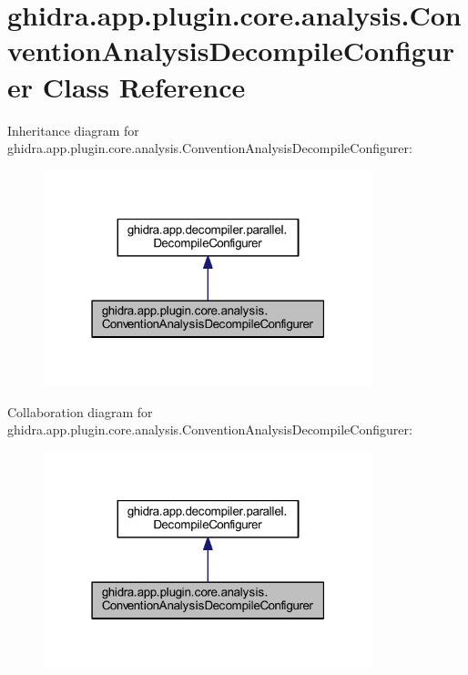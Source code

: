 \hypertarget{classghidra_1_1app_1_1plugin_1_1core_1_1analysis_1_1_convention_analysis_decompile_configurer}{}\section{ghidra.\+app.\+plugin.\+core.\+analysis.\+Convention\+Analysis\+Decompile\+Configurer Class Reference}
\label{classghidra_1_1app_1_1plugin_1_1core_1_1analysis_1_1_convention_analysis_decompile_configurer}


Inheritance diagram for ghidra.\+app.\+plugin.\+core.\+analysis.\+Convention\+Analysis\+Decompile\+Configurer\+:
\nopagebreak
\begin{figure}[H]
\begin{center}
\leavevmode
\includegraphics[width=271pt]{classghidra_1_1app_1_1plugin_1_1core_1_1analysis_1_1_convention_analysis_decompile_configurer__inherit__graph}
\end{center}
\end{figure}


Collaboration diagram for ghidra.\+app.\+plugin.\+core.\+analysis.\+Convention\+Analysis\+Decompile\+Configurer\+:
\nopagebreak
\begin{figure}[H]
\begin{center}
\leavevmode
\includegraphics[width=271pt]{classghidra_1_1app_1_1plugin_1_1core_1_1analysis_1_1_convention_analysis_decompile_configurer__coll__graph}
\end{center}
\end{figure}
